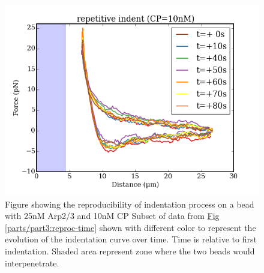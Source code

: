 \documentclass[A4paperpaper,11pt,english]{sphinxmanual}
\begin{document}
\begin{figure}[htbp]
\centering
\capstart

\includegraphics[width=0.800\linewidth]{reproc.png}
\caption{Figure showing the reproducibility of indentation process on a bead with
25nM Arp2/3 and 10nM CP Subset of data from \hyperref[parts/part3:reproc-time]{Fig  \ref*{parts/part3:reproc-time}} shown
with different color to represent the evolution of the indentation curve
over time.  Time is relative to first indentation. Shaded area represent
zone where the two beads would interpenetrate.}\label{parts/part3:reproc}\end{figure}
\end{document}
